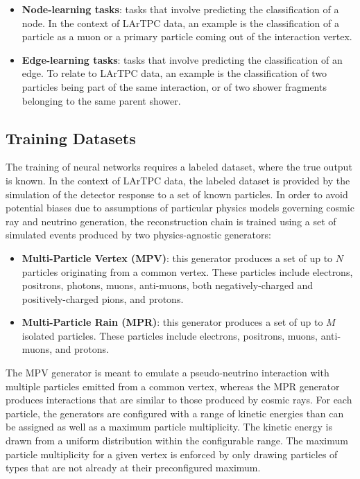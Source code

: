 \begin{itemize}
    \item \textbf{Node-learning tasks}: tasks that involve predicting the classification of a node. In the context of LArTPC data, an example is the classification of a particle as a muon or a primary particle coming out of the interaction vertex.
    \item \textbf{Edge-learning tasks}: tasks that involve predicting the classification of an edge. To relate to LArTPC data, an example is the classification of two particles being part of the same interaction, or of two shower fragments belonging to the same parent shower. 
\end{itemize}

\subsection{Training Datasets}
\label{sec:training_datasets}

The training of neural networks requires a labeled dataset, where the true output is known. In the context of LArTPC data, the labeled dataset is provided by the simulation of the detector response to a set of known particles. In order to avoid potential biases due to assumptions of particular physics models governing cosmic ray and neutrino generation, the reconstruction chain is trained using a set of simulated events produced by two physics-agnostic generators:

\begin{itemize}
    \item \textbf{Multi-Particle Vertex (MPV)}: this generator produces a set of up to $N$ particles originating from a common vertex. These particles include electrons, positrons, photons, muons, anti-muons, both negatively-charged and positively-charged pions, and protons.
    \item \textbf{Multi-Particle Rain (MPR)}: this generator produces a set of up to $M$ isolated particles. These particles include electrons, positrons, muons, anti-muons, and protons.
\end{itemize}

\noindent
The MPV generator is meant to emulate a pseudo-neutrino interaction with multiple particles emitted from a common vertex, whereas the MPR generator produces interactions that are similar to those produced by cosmic rays. For each particle, the generators are configured with a range of kinetic energies than can be assigned as well as a maximum particle multiplicity. The kinetic energy is drawn from a uniform distribution within the configurable range. The maximum particle multiplicity for a given vertex is enforced by only drawing particles of types that are not already at their preconfigured maximum.

